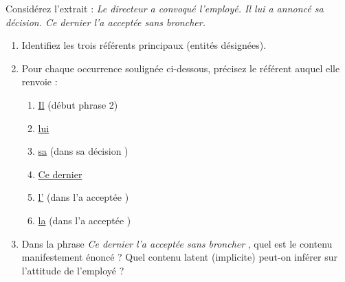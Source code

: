 \documentclass[11pt]{article}
\begin{document}
\begin{exercice}
Considérez l'extrait : \og \textit{Le directeur a convoqué l'employé. Il lui a annoncé sa décision. Ce dernier l'a acceptée sans broncher.} \fg{}

\begin{enumerate}
    \item Identifiez les trois référents principaux (entités désignées).
    \item Pour chaque occurrence soulignée ci-dessous, précisez le référent auquel elle renvoie :
    \begin{enumerate}
        \item \og \underline{Il} \fg{} (début phrase 2)
        \item \og \underline{lui} \fg{}
        \item \og \underline{sa} \fg{} (dans \og sa décision \fg{})
        \item \og \underline{Ce dernier} \fg{}
        \item \og \underline{l'} \fg{} (dans \og l'a acceptée \fg{})
        \item \og \underline{la} \fg{} (dans \og l'a acceptée \fg{})
    \end{enumerate}
    \item Dans la phrase \og \textit{Ce dernier l'a acceptée sans broncher} \fg{}, quel est le contenu manifestement énoncé ? Quel contenu latent (implicite) peut-on inférer sur l'attitude de l'employé ?
\end{enumerate}
\end{exercice}
\end{document}
